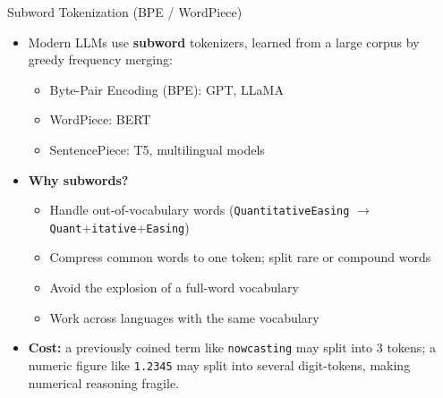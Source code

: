 \documentclass[10pt,english,aspectratio=169]{beamer}
\begin{document}
\begin{frame}{Subword Tokenization (BPE / WordPiece)}
\begin{itemize}
\item Modern LLMs use \textbf{subword} tokenizers, learned from a large corpus by greedy frequency merging:
\begin{itemize}
    \item Byte-Pair Encoding (BPE): GPT, LLaMA
    \item WordPiece: BERT
    \item SentencePiece: T5, multilingual models
\end{itemize}

\medskip
\item \textbf{Why subwords?}
\begin{itemize}
    \item Handle out-of-vocabulary words (\texttt{QuantitativeEasing} $\rightarrow$ \texttt{Quant}+\texttt{itative}+\texttt{Easing})
    \item Compress common words to one token; split rare or compound words
    \item Avoid the explosion of a full-word vocabulary
    \item Work across languages with the same vocabulary
\end{itemize}

\medskip
\item \textbf{Cost:} a previously coined term like \texttt{nowcasting} may split into 3 tokens; a numeric figure like \texttt{1.2345} may split into several digit-tokens, making numerical reasoning fragile.
\end{itemize}
\end{frame}
\end{document}
